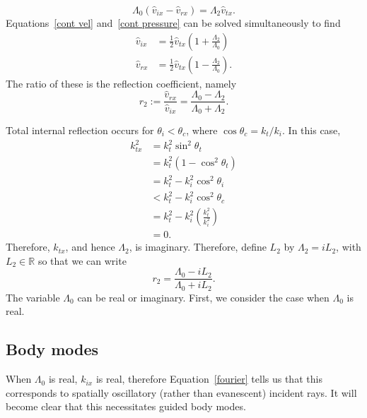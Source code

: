 \documentclass[12pt]{../style-files/ociamthesis}
\begin{document}
	\begin{equation}
	\Lambda_0(\hat{v}_{ix} - \hat{v}_{rx}) = \Lambda_2 \hat{v}_{tx}. \label{cont pressure}
	\end{equation}
	Equations~\eqref{cont vel} and~\eqref{cont pressure} can be solved simultaneously to find
	\begin{align}
	\hat{v}_{ix} &= \frac{1}{2}\hat{v}_{tx}\left(1 + \frac{\Lambda_2}{\Lambda_0}\right) \\
	\hat{v}_{rx} &= \frac{1}{2}\hat{v}_{tx}\left(1 - \frac{\Lambda_2}{\Lambda_0}\right).
	\end{align}
	The ratio of these is the reflection coefficient, namely
	\begin{equation}
	r_2 := \frac{\hat{v}_{rx}}{\hat{v}_{ix}} = \frac{\Lambda_0 - \Lambda_2}{\Lambda_0 + \Lambda_2}. \label{reflection coefficient}
	\end{equation}
	
	Total internal reflection occurs for $\theta_i < \theta_c$, where $\cos{\theta_c} = k_t / k_i$. In this case,
	\begin{align}
	k_{tx}^2 &= k_t^2 \sin^2{\theta_t} \\
	&= k_t^2(1 - \cos^2{\theta_t}) \\
	&= k_t^2 - k_i^2\cos^2{\theta_i} \\
	&< k_t^2 - k_i^2\cos^2{\theta_c} \\
	&= k_t^2 - k_i^2 \left(\frac{k_t^2}{k_i^2}\right) \\
	&= 0.
	\end{align}
	Therefore, $k_{tx}$, and hence $\Lambda_2$, is imaginary. Therefore, define $L_2$ by $\Lambda_2 = i L_2$, with $L_2 \in \mathbb{R}$ so that we can write
	\begin{equation}
	r_2 = \frac{\Lambda_0 - iL_2}{\Lambda_0 + iL_2}. \label{reflection coefficient 2}
	\end{equation}
	The variable $\Lambda_0$ can be real or imaginary. First, we consider the case when $\Lambda_0$ is real.
	
	
	\subsection{Body modes}
	When $\Lambda_0$ is real, $k_{ix}$ is real, therefore Equation~\eqref{fourier} tells us that this corresponds to spatially oscillatory (rather than evanescent) incident rays. It will become clear that this necessitates guided body modes.
	
\end{document}
